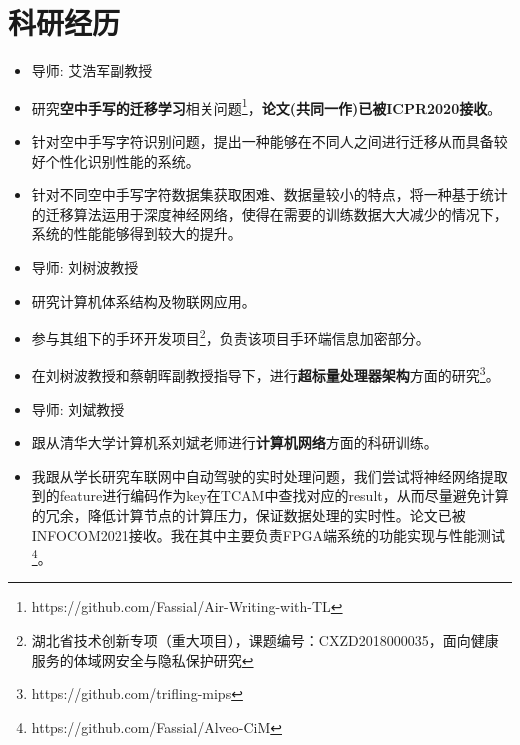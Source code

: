 \documentclass{resume}
\begin{document}
\section{{\bfseries 科研经历}}
\begin{itemize}[parsep=0.2ex]
    \item 导师: 艾浩军副教授
    \item 研究\textbf{空中手写的迁移学习}相关问题\footnote{https://github.com/Fassial/Air-Writing-with-TL}，\textbf{论文(共同一作)已被ICPR2020接收}。
    \item 针对空中手写字符识别问题，提出一种能够在不同人之间进行迁移从而具备较好个性化识别性能的系统。
    \item 针对不同空中手写字符数据集获取困难、数据量较小的特点，将一种基于统计的迁移算法运用于深度神经网络，使得在需要的训练数据大大减少的情况下，系统的性能能够得到较大的提升。
\end{itemize}
\begin{itemize}[parsep=0.2ex]
    \item 导师: 刘树波教授
    \item 研究计算机体系结构及物联网应用。
    \item 参与其组下的手环开发项目\footnote{湖北省技术创新专项（重大项目），课题编号：CXZD2018000035，面向健康服务的体域网安全与隐私保护研究}，负责该项目手环端信息加密部分。
    \item 在刘树波教授和蔡朝晖副教授指导下，进行\textbf{超标量处理器架构}方面的研究\footnote{https://github.com/trifling-mips}。
\end{itemize}
\begin{itemize}[parsep=0.2ex]
    \item 导师: 刘斌教授
    \item 跟从清华大学计算机系刘斌老师进行\textbf{计算机网络}方面的科研训练。
    \item 我跟从学长研究车联网中自动驾驶的实时处理问题，我们尝试将神经网络提取到的feature进行编码作为key在TCAM中查找对应的result，从而尽量避免计算的冗余，降低计算节点的计算压力，保证数据处理的实时性。论文已被INFOCOM2021接收。我在其中主要负责FPGA端系统的功能实现与性能测试\footnote{https://github.com/Fassial/Alveo-CiM}。
\end{itemize}
\end{document}
